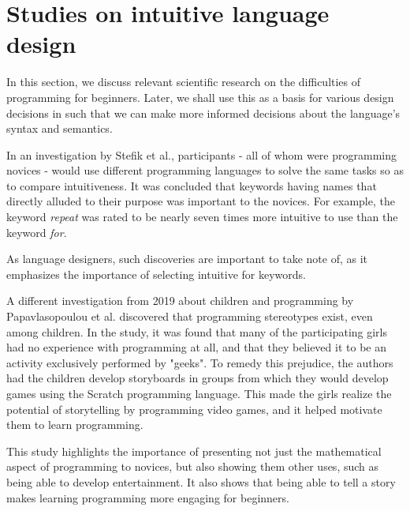 \section{Studies on intuitive language design} \label{sec:scientific_research}
In this section, we discuss relevant scientific research on the difficulties of programming for beginners.
Later, we shall use this as a basis for various design decisions in \dazel{} such that we can make more
informed decisions about the language's syntax and semantics.

In an investigation by Stefik et al.\cite{stefik_empirical_2011}, participants - all of whom were
programming novices - would use different programming languages to solve the same tasks so as to compare intuitiveness.
It was concluded that keywords having names that directly alluded to their purpose was important to the novices.
For example, the keyword \emph{repeat} was rated to be nearly seven times more intuitive to use than the keyword \emph{for}.

\noindent
As language designers, such discoveries are important to take note of, as it emphasizes the importance of selecting intuitive for keywords.

A different investigation from 2019 about children and programming by Papavlasopoulou et al.\cite{papavlasopoulou_exploring_2019} discovered that
programming stereotypes exist, even among children.
In the study, it was found that many of the participating girls had no experience with programming at all, and that they believed it
to be an activity exclusively performed by "geeks".
To remedy this prejudice, the authors had the children develop storyboards in groups from which they would develop games using the
Scratch programming language.
This made the girls realize the potential of storytelling by programming video games, and it helped motivate them to learn programming.

\noindent
This study highlights the importance of presenting not just the mathematical aspect of programming to novices, but also
showing them other uses, such as being able to develop entertainment.
It also shows that being able to tell a story makes learning programming more engaging for beginners.


